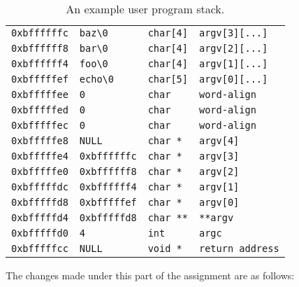 \documentclass{article}
\begin{document}
\label{table:1}
\begin{table}[th]
    \centering
    \begin{tabular}{llll}
        \verb!0xbffffffc! & \verb!baz\0! & \verb!char[4]! & \verb!argv[3][...]!\\
        \verb!0xbffffff8! & \verb!bar\0! & \verb!char[4]! & \verb!argv[2][...]! \\
        \verb!0xbffffff4! & \verb!foo\0! & \verb!char[4]! & \verb!argv[1][...]! \\
        \verb!0xbfffffef! & \verb!echo\0! & \verb!char[5]! & \verb!argv[0][...]! \\
        \verb!0xbfffffee! & \verb!0! & \verb!char! & \verb!word-align!\\
        \verb!0xbfffffed! & \verb!0! & \verb!char! & \verb!word-align! \\
        \verb!0xbfffffec! & \verb!0! & \verb!char! & \verb!word-align! \\
        \verb!0xbfffffe8! & \verb!NULL! & \verb!char *! & \verb!argv[4]! \\
        \verb!0xbfffffe4! & \verb!0xbffffffc! & \verb!char *! & \verb!argv[3]! \\
        \verb!0xbfffffe0! & \verb!0xbffffff8! & \verb!char *! & \verb!argv[2]! \\
        \verb!0xbfffffdc! & \verb!0xbffffff4! & \verb!char *! & \verb!argv[1]! \\
        \verb!0xbfffffd8! & \verb!0xbfffffef! & \verb!char *! & \verb!argv[0]! \\
        \verb!0xbfffffd4! & \verb!0xbfffffd8! & \verb!char **! & \verb!**argv! \\
        \verb!0xbfffffd0! & \verb!4! & \verb!int! & \verb!argc! \\
        \verb!0xbfffffcc! & \verb!NULL! & \verb!void *! & \verb!return address! \\
    \end{tabular}
    \caption{An example user program stack.}
\end{table}

The changes made under this part of the assignment are as follows:
\end{document}

